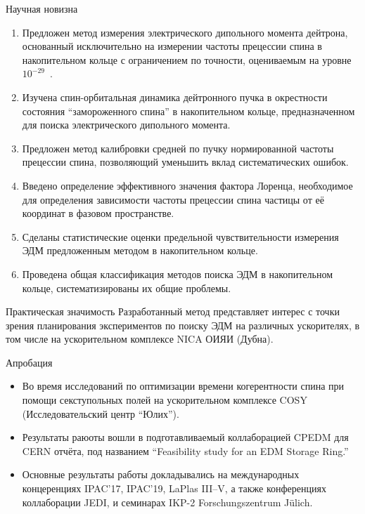 \documentclass[14pt]{beamer}
\begin{document}
\begin{frame}{Научная новизна}
\begin{enumerate}
	\item Предложен метод измерения электрического дипольного момента дейтрона,
	основанный исключительно на измерении частоты прецессии спина в накопительном кольце 
	с ограничением по точности, оцениваемым на уровне $10^{-29}$~\ecm.
	\item Изучена спин-орбитальная динамика дейтронного пучка в окрестности состояния ``замороженного спина''
	в накопительном кольце, предназначенном для поиска электрического дипольного момента. 
	\item Предложен метод калибровки средней по пучку нормированной частоты прецессии спина, позволяющий уменьшить вклад систематических ошибок.
\end{enumerate}
\end{frame}
\begin{frame}
	\begin{enumerate} \setcounter{enumi}{3}
		\item Введено определение эффективного значения фактора Лоренца, необходимое для 
		определения зависимости частоты прецессии спина частицы от её координат в фазовом пространстве. 
		\item Сделаны статистические оценки предельной чувствительности измерения ЭДМ предложенным методом в накопительном кольце. 
		\item Проведена общая классификация методов поиска ЭДМ в накопительном кольце, систематизированы их общие проблемы.
	\end{enumerate}
\end{frame}

\begin{frame}{Практическая значимость}
Разработанный метод представляет интерес с точки зрения планирования экспериментов по поиску ЭДМ
на различных ускорителях, в том числе на ускорительном комплексе NICA ОИЯИ (Дубна).
\end{frame}

\begin{frame}{Апробация}
\begin{itemize}
\item Во время исследований по оптимизации времени когерентности спина при помощи секступольных полей на ускорительном комплексе COSY (Исследовательский центр ``Юлих'').
\item Результаты раюоты вошли в подготавливаемый коллаборацией CPEDM для CERN отчёта, под названием ``Feasibility study for an EDM Storage Ring.''
\item Основные результаты работы докладывались на международных концеренциях IPAC'17, IPAC'19, LaPlas III--V, а также конференциях коллаборации JEDI, и семинарах IKP-2 Forschungszentrum J\"ulich.
\end{itemize}
\end{frame}
\end{document}

